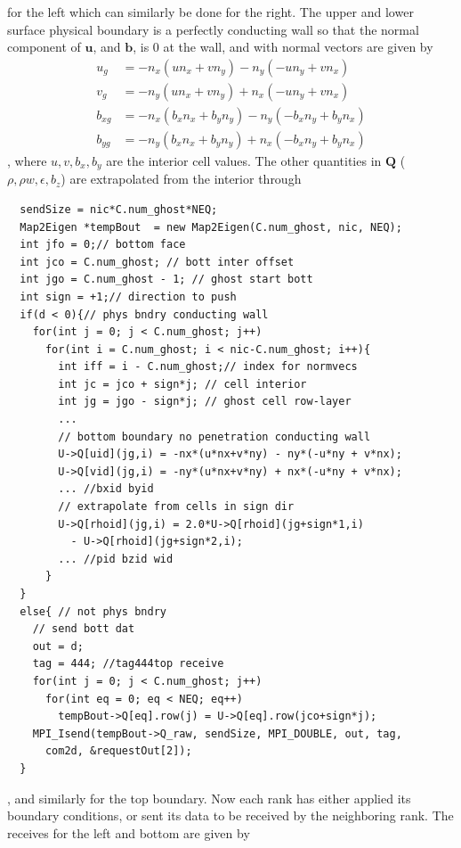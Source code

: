\documentclass[paper=a4, fontsize=11pt]{scrartcl}
\numberwithin{equation}{section}                %
\numberwithin{figure}{section}                  %
\numberwithin{table}{section}                           %
\begin{document}
for the left which can similarly be done for the right. The upper and lower surface physical boundary is a perfectly conducting wall so that the normal component of $\mathbf{u}$, and $\mathbf{b}$, is $0$ at the wall, and with normal vectors are given by
\begin{align*}
  u_g &= -n_x(u n_x + v n_y) - n_y(-u n_y + v n_x)\\
  v_g &= -n_y(u n_x + v n_y) + n_x(-u n_y + v n_x)\\
  b_{xg} &= -n_x(b_x n_x+b_y n_y) - n_y( -b_x n_y + b_y n_x)\\
  b_{yg} &= -n_y(b_x n_x + b_y n_y) + n_x(-b_x n_y + b_y n_x)
\end{align*}
, where $u,v,b_x,b_y$ are the interior cell values. The other quantities in $\mathbf{Q}$ ($\rho, \rho w, \epsilon, b_z$) are extrapolated from the interior through
\begin{verbatim}
  sendSize = nic*C.num_ghost*NEQ;
  Map2Eigen *tempBout  = new Map2Eigen(C.num_ghost, nic, NEQ);
  int jfo = 0;// bottom face
  int jco = C.num_ghost; // bott inter offset
  int jgo = C.num_ghost - 1; // ghost start bott
  int sign = +1;// direction to push
  if(d < 0){// phys bndry conducting wall
    for(int j = 0; j < C.num_ghost; j++)
      for(int i = C.num_ghost; i < nic-C.num_ghost; i++){
        int iff = i - C.num_ghost;// index for normvecs
        int jc = jco + sign*j; // cell interior
        int jg = jgo - sign*j; // ghost cell row-layer
        ...
        // bottom boundary no penetration conducting wall
        U->Q[uid](jg,i) = -nx*(u*nx+v*ny) - ny*(-u*ny + v*nx);
        U->Q[vid](jg,i) = -ny*(u*nx+v*ny) + nx*(-u*ny + v*nx);
        ... //bxid byid
        // extrapolate from cells in sign dir
        U->Q[rhoid](jg,i) = 2.0*U->Q[rhoid](jg+sign*1,i) 
          - U->Q[rhoid](jg+sign*2,i);
        ... //pid bzid wid
      }
  }
  else{ // not phys bndry
    // send bott dat
    out = d;
    tag = 444; //tag444top receive
    for(int j = 0; j < C.num_ghost; j++)
      for(int eq = 0; eq < NEQ; eq++)
        tempBout->Q[eq].row(j) = U->Q[eq].row(jco+sign*j);
    MPI_Isend(tempBout->Q_raw, sendSize, MPI_DOUBLE, out, tag, 
      com2d, &requestOut[2]); 
  }
\end{verbatim}
, and similarly for the top boundary. Now each rank has either applied its boundary conditions, or sent its data to be received by the neighboring rank. The receives for the left and bottom are given by
\end{document}
